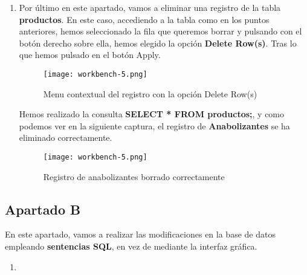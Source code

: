 \begin{enumerate}
    \item Por último en este apartado, vamos a eliminar una registro de la tabla \textbf{productos}. En este caso, accediendo a la tabla como en los puntos anteriores, hemos seleccionado la fila que queremos borrar y pulsando con el botón derecho sobre ella, hemos elegido la opción \textbf{Delete Row(s)}. Tras lo que hemos pulsado en el botón Apply.

    \begin{figure}[H]
        \centering
        \texttt{[image: workbench-5.png]}
        \caption{Menu contextual del registro con la opción Delete Row(s)}
    \end{figure}

    Hemos realizado la consulta \textbf{SELECT * FROM productos;}, y como podemos ver en la siguiente captura, el registro de \textbf{Anabolizantes} se ha eliminado correctamente.

    \begin{figure}[H]
        \centering
        \texttt{[image: workbench-5.png]}
        \caption{Registro de anabolizantes borrado correctamente}
    \end{figure}
\end{enumerate}

\subsection{Apartado B}

En este apartado, vamos a realizar las modificaciones en la base de datos empleando \textbf{sentencias SQL}, en vez de mediante la interfaz gráfica.

\begin{enumerate}
    \item
\end{enumerate}


%
%

